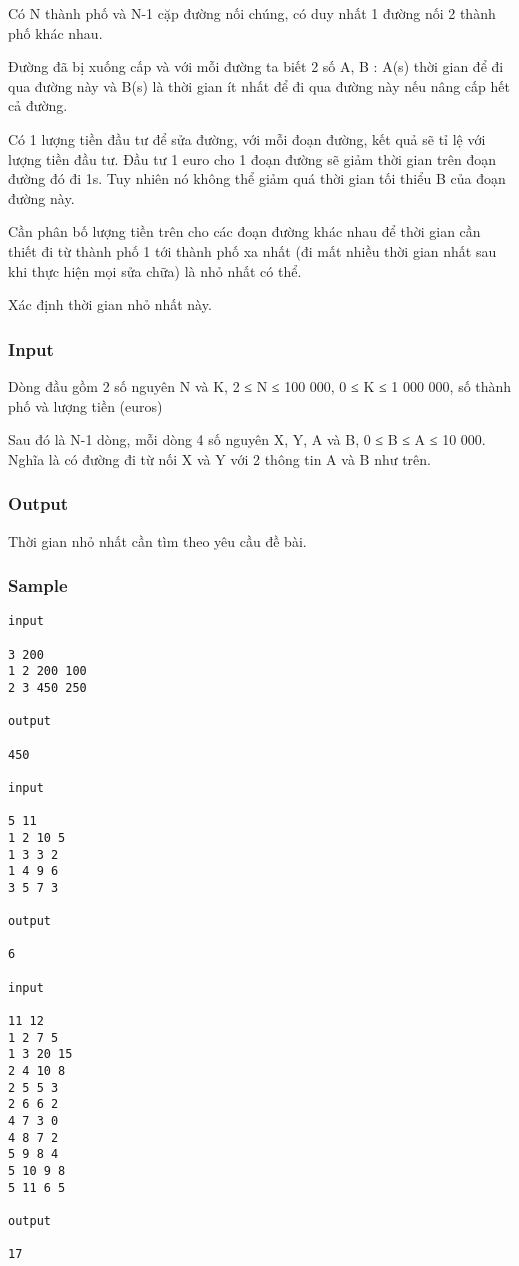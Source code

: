 

Có N thành phố và N-1 cặp đường nối chúng, có duy nhất 1 đường nối 2 thành phố khác nhau.

Đường đã bị xuống cấp và với mỗi đường ta biết 2 số A, B : A(s) thời gian để đi qua đường này và B(s) là thời gian ít nhất để đi qua đường này nếu nâng cấp hết cả đường.

Có 1 lượng tiền đầu tư để sửa đường, với mỗi đoạn đường, kết quả sẽ tỉ lệ với lượng tiền đầu tư. Đầu tư 1 euro cho 1 đoạn đường sẽ giảm thời gian trên đoạn đường đó đi 1s. Tuy nhiên nó không thể giảm quá thời gian tối thiểu B của đoạn đường này.

Cần phân bố lượng tiền trên cho các đoạn đường khác nhau để thời gian cần thiết đi từ thành phố 1 tới thành phố xa nhất (đi mất nhiều thời gian nhất sau khi thực hiện mọi sửa chữa) là nhỏ nhất có thể.

Xác định thời gian nhỏ nhất này.

\subsubsection{Input}

Dòng đầu gồm 2 số nguyên N và K, 2 ≤ N ≤ 100 000, 0 ≤ K ≤ 1 000 000, số thành phố và lượng tiền (euros)

Sau đó là N-1 dòng, mỗi dòng 4 số nguyên X, Y, A và B, 0 ≤ B ≤ A ≤ 10 000. Nghĩa là có đường đi từ nối X và Y với 2 thông tin A và B như trên.

\subsubsection{Output}

Thời gian nhỏ nhất cần tìm theo yêu cầu đề bài.

\subsubsection{Sample}
\begin{verbatim}
input 
 
3 200 
1 2 200 100 
2 3 450 250 
 
output 
 
450

input 
 
5 11 
1 2 10 5 
1 3 3 2 
1 4 9 6 
3 5 7 3 
 
output 
 
6

input 
 
11 12 
1 2 7 5 
1 3 20 15 
2 4 10 8 
2 5 5 3 
2 6 6 2 
4 7 3 0 
4 8 7 2 
5 9 8 4 
5 10 9 8 
5 11 6 5 
 
output 
 
17\end{verbatim}

 